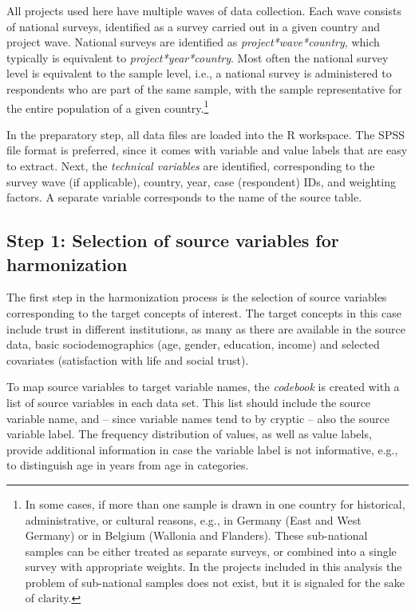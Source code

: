 \documentclass[12pt,]{article}
\let\rmarkdownfootnote\footnote%
\def\footnote{\protect\rmarkdownfootnote}
\begin{document}
All projects used here have multiple waves of data collection. Each wave consists of national surveys, identified as a survey carried out in a given country and project wave. National surveys are identified as \emph{project*wave*country}, which typically is equivalent to \emph{project*year*country}. Most often the national survey level is equivalent to the sample level, i.e., a national survey is administered to respondents who are part of the same sample, with the sample representative for the entire population of a given country.\footnote{In some cases, if more than one sample is drawn in one country for historical, administrative, or cultural reasons, e.g., in Germany (East and West Germany) or in Belgium (Wallonia and Flanders). These sub-national samples can be either treated as separate surveys, or combined into a single survey with appropriate weights. In the projects included in this analysis the problem of sub-national samples does not exist, but it is signaled for the sake of clarity.}

In the preparatory step, all data files are loaded into the R workspace. The SPSS file format is preferred, since it comes with variable and value labels that are easy to extract. Next, the \emph{technical variables} are identified, corresponding to the survey wave (if applicable), country, year, case (respondent) IDs, and weighting factors. A separate variable corresponds to the name of the source table.

\hypertarget{step-1-selection-of-source-variables-for-harmonization}{%
\subsection{Step 1: Selection of source variables for harmonization}\label{step-1-selection-of-source-variables-for-harmonization}}

The first step in the harmonization process is the selection of source variables corresponding to the target concepts of interest. The target concepts in this case include trust in different institutions, as many as there are available in the source data, basic sociodemographics (age, gender, education, income) and selected covariates (satisfaction with life and social trust).

To map source variables to target variable names, the \emph{codebook} is created with a list of source variables in each data set. This list should include the source variable name, and -- since variable names tend to by cryptic -- also the source variable label. The frequency distribution of values, as well as value labels, provide additional information in case the variable label is not informative, e.g., to distinguish age in years from age in categories.
\end{document}
